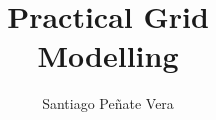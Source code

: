 \documentclass[a4paper,twoside]{tufte-book}
\title{Practical Grid\\Modelling}
\author[]{Santiago Pe\~nate Vera}
\newcommand{\monthyear}{%
  \ifcase\month\or January\or February\or March\or April\or May\or June\or
  July\or August\or September\or October\or November\or
  December\fi\space\number\year
}
\newcommand{\openepigraph}[2]{%
  \begin{fullwidth}
  \sffamily\large
  \begin{doublespace}
  \noindent\allcaps{#1}\\%
  \noindent\allcaps{#2}%
  \end{doublespace}
  \end{fullwidth}
}
\newcommand{\blankpage}{\newpage\hbox{}\thispagestyle{empty}\newpage}
\begin{document}
\frontmatter




\maketitle

\doclicenseThis

\newpage
%
%
%
%
\end{document}
